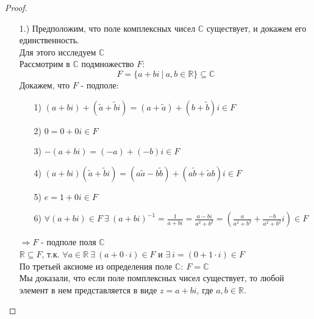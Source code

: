 \documentclass[a4paper, 12pt]{article}
\newcommand{\R}{\mathbb R}
\newcommand\tab[1][.5cm]{\hspace*{#1}}
\theoremstyle{definition}
\begin{document}
  \begin{proof}\tab
    \begin{itemize}
      \item[1.)]Предположим, что поле комплексных чисел $\mathbb{C}$ существует, и докажем его единственность. \\
      Для этого исследуем $\mathbb{C}$ \\
      Рассмотрим в $\mathbb{C}$ подмножество $F$: 
      $$F = \{a+bi \ | \ a,b \in \R\} \subseteq \mathbb{C}$$
      Докажем, что $F$ - подполе:
      \begin{itemize}
        \item[1)] $(a+bi) + (\widetilde{a}+\widetilde{b}i) = (a + \widetilde{a})+(b+\widetilde{b})i \in F$
        \item[2)] $0 = 0 + 0i \in F$
        \item[3)] $-(a+bi) = (-a) + (-b)i\in F$
        \item[4)] $(a+bi)(\widetilde{a}+\widetilde{b}i) = (a \widetilde{a}-b \widetilde{b}) + (a \widetilde{b}+ \widetilde{a} b)i \in F$
        \item[5)] $e = 1 + 0i \in F$
        \item[6)] $\forall (a+bi) \in F \ \exists \ (a+bi)^{-1} = \frac{1}{a+bi} = \frac{a-bi}{a^2+b^2} = (\frac{a}{a^2+b^2} + \frac{-b}{a^2+b^2}i) \in F$ 
      \end{itemize}
      $\Longrightarrow F$ - подполе поля $\mathbb{C}$ \\
      $\R \subseteq F$, т.к. $\forall a \in \R \ \exists \ (a + 0 \cdot i) \in F$ и $\exists \ i = (0 + 1 \cdot i) \in F$\\
      По третьей аксиоме из определения поле $\mathbb{C}: \ F=\mathbb{C}$\\
      Мы доказали, что если поле помплексных чисел существует, то любой элемент в нем представляется в виде $z = a + bi$, где $a, b \in \R$.\\

\end{itemize}
\end{proof}
\end{document}
